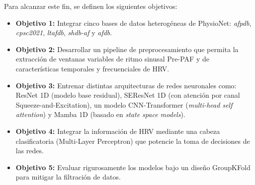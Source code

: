 Para alcanzar este fin, se definen los siguientes objetivos:
\begin{itemize}
  \item \textbf{Objetivo 1:} 
  Integrar cinco bases de datos heterogéneas de PhysioNet:
  \textit{afpdb}, \textit{cpsc2021}, \textit{ltafdb}, \textit{shdb-af} y \textit{afdb}.
  \item \textbf{Objetivo 2:} 
  Desarrollar un pipeline de preprocesamiento que permita la
  extracción de ventanas variables de ritmo sinusal Pre-PAF y de características
  temporales y frecuenciales de HRV.
  \item \textbf{Objetivo 3:} 
  Entrenar distintas arquitecturas de redes neuronales como: ResNet 1D (modelo base residual),
  SEResNet 1D (con atención por canal Squeeze-and-Excitation),
  un modelo CNN-Transformer (\textit{multi-head self attention})
  y Mamba 1D (basado en \textit{state space models}).
  \item \textbf{Objetivo 4:} 
  Integrar la información de HRV mediante una cabeza clasificatoria
  (Multi-Layer Perceptron) que potencie la toma de decisiones de
  las redes.
  \item \textbf{Objetivo 5:} 
  Evaluar rigurosamente los modelos bajo un diseño GroupKFold para mitigar
  la filtración de datos.
\end{itemize}


